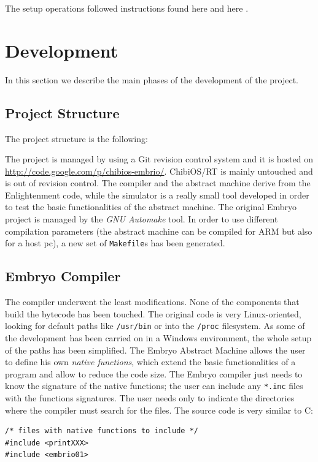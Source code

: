 \documentclass[a4paper,10pt]{article}
\begin{document}
\begin{multicols}{2}
The setup operations followed instructions found here \cite{setup1} and here \cite{setup2}.


\section{Development}

In this section we describe the main phases of the development of the project.


\subsection{Project Structure}

The project structure is the following:
\newline

\bigskip
The project is managed by using a Git revision control system and it is hosted on \url{http://code.google.com/p/chibios-embrio/}. ChibiOS/RT is mainly untouched and is out of revision control. The compiler and the abstract machine derive from the Enlightenment code, while the simulator is a really small tool developed in order to test the basic functionalities of the abstract machine. The original Embryo project is managed by the \textit{GNU Automake} tool. In order to use different compilation parameters (the abstract machine can be compiled for ARM but also for a host pc), a new set of \texttt{Makefile}s has been generated.

\subsection{Embryo Compiler}

The compiler underwent the least modifications. None of the components that build the bytecode has been touched. The original code is very Linux-oriented, looking for default paths like \texttt{/usr/bin} or into the \texttt{/proc} filesystem. As some of the development has been carried on in a Windows environment, the whole setup of the paths has been simplified.
The Embryo Abstract Machine allows the user to define his own \textit{native functions}, which extend the basic functionalities of a program and allow to reduce the code size. The Embryo compiler just needs to know the signature of the native functions; the user can include any \texttt{*.inc} files with the functions signatures. The user needs only to indicate the directories where the compiler must search for the files. The source code is very similar to C:
\medskip
\begin{lstlisting}[caption={include directives in Embryo}]
/* files with native functions to include */
#include <printXXX>
#include <embrio01>


\end{lstlisting}
\end{multicols}
\end{document}
